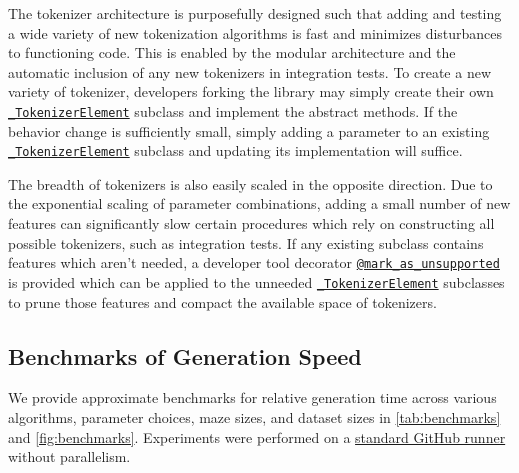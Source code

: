 \documentclass[10pt,a4paper,onecolumn]{article}
\begin{document}
The tokenizer architecture is purposefully designed such that adding and
testing a wide variety of new tokenization algorithms is fast and
minimizes disturbances to functioning code. This is enabled by the
modular architecture and the automatic inclusion of any new tokenizers
in integration tests. To create a new variety of tokenizer, developers
forking the library may simply create their own
\href{https://understanding-search.github.io/maze-dataset/maze_dataset/tokenization.html\#_TokenizerElement}{\texttt{\_TokenizerElement}}
subclass and implement the abstract methods. If the behavior change is
sufficiently small, simply adding a parameter to an existing
\href{https://understanding-search.github.io/maze-dataset/maze_dataset/tokenization.html\#_TokenizerElement}{\texttt{\_TokenizerElement}}
subclass and updating its implementation will suffice.

The breadth of tokenizers is also easily scaled in the opposite
direction. Due to the exponential scaling of parameter combinations,
adding a small number of new features can significantly slow certain
procedures which rely on constructing all possible tokenizers, such as
integration tests. If any existing subclass contains features which
aren't needed, a developer tool decorator
\href{https://understanding-search.github.io/maze-dataset/maze_dataset/tokenization/modular/element_base.html\#mark_as_unsupported}{\texttt{@mark\_as\_unsupported}}
is provided which can be applied to the unneeded
\href{https://understanding-search.github.io/maze-dataset/maze_dataset/tokenization.html\#_TokenizerElement}{\texttt{\_TokenizerElement}}
subclasses to prune those features and compact the available space of
tokenizers.

\hypertarget{benchmarks}{%
\subsection{Benchmarks of Generation Speed}\label{benchmarks}}

We provide approximate benchmarks for relative generation time across
various algorithms, parameter choices, maze sizes, and dataset sizes in
\autoref{tab:benchmarks} and \autoref{fig:benchmarks}. Experiments were
performed on a
\href{https://docs.github.com/en/actions/using-github-hosted-runners/using-github-hosted-runners/about-github-hosted-runners#standard-github-hosted-runners-for-public-repositories}{standard GitHub runner}
without parallelism.
\end{document}

